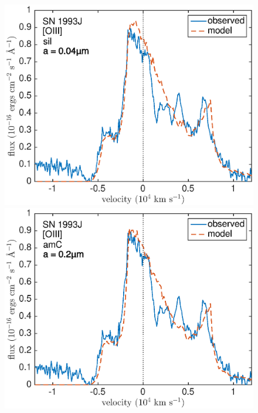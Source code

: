 \begin{figure}[!t]
\centering
\includegraphics[scale=0.4,clip=true, trim=0 0 40 20]{chapters/chapter6/figs/93J/smooth/OIII} \hspace{0.5mm}
\includegraphics[scale=0.4,clip=true, trim=40 0 40 20]{chapters/chapter6/figs/93J/smooth/OIII_amC}


\end{figure}
